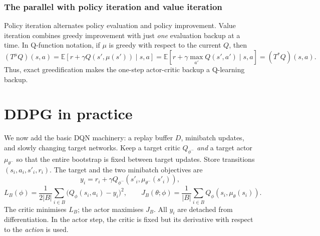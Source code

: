 \documentclass[11pt,a4paper]{article}
\newcommand{\E}{\mathbb{E}}
\newcommand{\nexttopic}{\clearpage}
\begin{document}
\subsubsection{The parallel with policy iteration and value iteration}
Policy iteration alternates policy evaluation and policy improvement.
Value iteration combines greedy improvement with just \emph{one} evaluation
backup at a time. In Q-function notation, if $\mu$ is greedy with respect to
the current $Q$, then
\begin{equation}
 (T^\mu Q)(s,a)
 =\E\!\left[r+\gamma Q(s',\mu(s'))\mid s,a\right]
 =\E\!\left[r+\gamma\max_{a'}Q(s',a')\mid s,a\right]
 =(T^*Q)(s,a).
\end{equation}
Thus, exact greedification makes the one-step actor-critic backup a
Q-learning backup.

\nexttopic
\section{DDPG in practice}
We now add the basic DQN machinery: a replay buffer $D$, minibatch updates,
and slowly changing target networks. Keep a target critic $Q_{\phi^-}$
\emph{and} a target actor $\mu_{\theta^-}$ so that the entire bootstrap
is fixed between target updates. Store transitions $(s_i,a_i,s'_i,r_i)$. The target and the two minibatch objectives are
\begin{equation}\label{eq:batch-target}
 y_i=r_i+\gamma
 Q_{\phi^-}(s'_i,\mu_{\theta^-}(s'_i)),
\end{equation}
\begin{equation}\label{eq:batch-objectives}
 L_B(\phi)=\frac{1}{2|B|}\sum_{i\in B}\bigl(Q_\phi(s_i,a_i)-y_i\bigr)^2,
 \qquad
 J_B(\theta;\phi)=\frac{1}{|B|}\sum_{i\in B}Q_\phi(s_i,\mu_\theta(s_i)).
\end{equation}
The critic minimises $L_B$; the actor maximises $J_B$. All $y_i$ are detached
from differentiation. In the actor step, the critic is fixed but its
derivative with respect to the \emph{action} is used.
\end{document}
